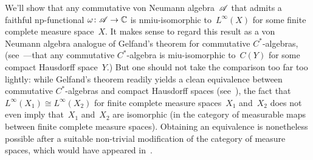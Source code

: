 \documentclass[a]{subfiles}
\begin{document}
\begin{parsec}%
\begin{point}%
We'll show that any commutative von Neumann algebra~$\mathscr{A}$
that admits a faithful np-functional $\omega\colon \mathscr{A}\to \mathbb{C}$
is nmiu-isomorphic  to~$L^\infty(X)$
for some finite complete measure space~$X$.
It makes sense to regard this result
as a von Neumann algebra analogue
of Gelfand's theorem for commutative $C^*$-algebras,
(see~---that any commutative $C^*$-algebra
is miu-isomorphic to~$C(Y)$ for some compact Hausdorff space~$Y$.)
But one should not take the
comparison too far too lightly:
while Gelfand's theorem readily
yields a clean equivalence 
between commutative $C^*$-algebras
and compact Hausdorff spaces
(see~),
the fact that  $L^\infty(X_1)\cong L^\infty(X_2)$
for finite complete measure spaces~$X_1$
and~$X_2$ does not even imply that~$X_1$ and~$X_2$ are 
isomorphic 
(in the category of measurable maps between finite complete
measure spaces).
Obtaining an equivalence is nonetheless
possible after a suitable non-trivial modification
of the category of measure spaces,
which would have appeared in~.


\end{point}
\end{parsec}
\end{document}
